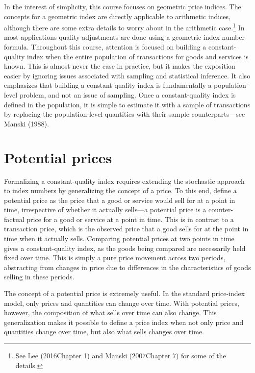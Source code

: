 \documentclass[
]{article}
\begin{document}
In the interest of simplicity, this course focuses on geometric price indices. The concepts for a geometric index are directly applicable to arithmetic indices, although there are some extra details to worry about in the arithmetic case.\footnote{See Lee (2016Chapter 1) and Manski (2007Chapter 7) for some of the details.} In most applications quality adjustments are done using a geometric index-number formula. Throughout this course, attention is focused on building a constant-quality index when the entire population of transactions for goods and services is known. This is almost never the case in practice, but it makes the exposition easier by ignoring issues associated with sampling and statistical inference. It also emphasizes that building a constant-quality index is fundamentally a population-level problem, and not an issue of sampling. Once a constant-quality index is defined in the population, it is simple to estimate it with a sample of transactions by replacing the population-level quantities with their sample counterparts---see Manski (1988).

\hypertarget{potential-prices}{%
\section{Potential prices}\label{potential-prices}}

Formalizing a constant-quality index requires extending the stochastic approach to index numbers by generalizing the concept of a price. To this end, define a potential price as the price that a good or service would sell for at a point in time, irrespective of whether it actually sells---a potential price is a counter-factual price for a good or service at a point in time. This is in contrast to a transaction price, which is the observed price that a good sells for at the point in time when it actually sells. Comparing potential prices at two points in time gives a constant-quality index, as the goods being compared are necessarily held fixed over time. This is simply a pure price movement across two periods, abstracting from changes in price due to differences in the characteristics of goods selling in these periods.

The concept of a potential price is extremely useful. In the standard price-index model, only prices and quantities can change over time. With potential prices, however, the composition of what sells over time can also change. This generalization makes it possible to define a price index when not only price and quantities change over time, but also what sells changes over time.
\end{document}
